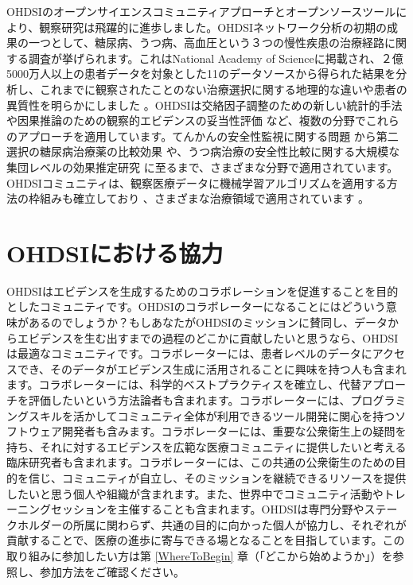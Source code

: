 \documentclass[
  11pt]{book}
\theoremstyle{definition}
\theoremstyle{definition}
\theoremstyle{definition}
\theoremstyle{definition}
\theoremstyle{remark}
\begin{document}
OHDSIのオープンサイエンスコミュニティアプローチとオープンソースツールにより、観察研究は飛躍的に進歩しました。OHDSIネットワーク分析の初期の成果の一つとして、糖尿病、うつ病、高血圧という３つの慢性疾患の治療経路に関する調査が挙げられます。これはNational Academy of Scienceに掲載され、２億5000万人以上の患者データを対象とした11のデータソースから得られた結果を分析し、これまでに観察されたことのない治療選択に関する地理的な違いや患者の異質性を明らかにしました \citep{Hripcsak7329} 。OHDSIは交絡因子調整のための新しい統計的手法 \citep{tian_2018} や因果推論のための観察的エビデンスの妥当性評価 \citep{schuemie_2018} など、複数の分野でこれらのアプローチを適用しています。てんかんの安全性監視に関する問題 \citep{duke_2017} から第二選択の糖尿病治療薬の比較効果 \citep{vashisht_2018} や、うつ病治療の安全性比較に関する大規模な集団レベルの効果推定研究 \citep{schuemie_2018b} に至るまで、さまざまな分野で適用されています。OHDSIコミュニティは、観察医療データに機械学習アルゴリズムを適用する方法の枠組みも確立しており \citep{reps2018}、さまざまな治療領域で適用されています \citep{johnston_2019, cepeda_2018, reps_2019}。

\section{OHDSIにおける協力}\label{ohdsiux306bux304aux3051ux308bux5354ux529b}

OHDSIはエビデンスを生成するためのコラボレーションを促進することを目的としたコミュニティです。OHDSIのコラボレーターになることにはどういう意味があるのでしょうか？もしあなたがOHDSIのミッションに賛同し、データからエビデンスを生む出すまでの過程のどこかに貢献したいと思うなら、OHDSIは最適なコミュニティです。コラボレーターには、患者レベルのデータにアクセスでき、そのデータがエビデンス生成に活用されることに興味を持つ人も含まれます。コラボレーターには、科学的ベストプラクティスを確立し、代替アプローチを評価したいという方法論者も含まれます。コラボレーターには、プログラミングスキルを活かしてコミュニティ全体が利用できるツール開発に関心を持つソフトウェア開発者も含みます。コラボレーターには、重要な公衆衛生上の疑問を持ち、それに対するエビデンスを広範な医療コミュニティに提供したいと考える臨床研究者も含まれます。コラボレーターには、この共通の公衆衛生のための目的を信じ、コミュニティが自立し、そのミッションを継続できるリソースを提供したいと思う個人や組織が含まれます。また、世界中でコミュニティ活動やトレーニングセッションを主催することも含まれます。OHDSIは専門分野やステークホルダーの所属に関わらず、共通の目的に向かった個人が協力し、それぞれが貢献することで、医療の進歩に寄与できる場となることを目指しています。この取り組みに参加したい方は第 \ref{WhereToBegin} 章（「どこから始めようか」）を参照し、参加方法をご確認ください。
\end{document}
